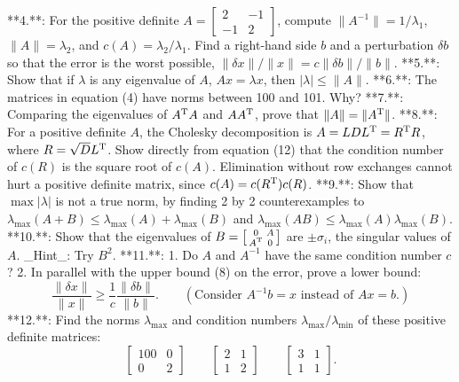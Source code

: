 

**4.**: For the positive definite \(A=\left[\begin{smallmatrix}2&-1\\ -1&2\end{smallmatrix}\right]\), compute \(\|A^{-1}\|=1/\lambda_{1}\), \(\|A\|=\lambda_{2}\), and \(c(A)=\lambda_{2}/\lambda_{1}\). Find a right-hand side \(b\) and a perturbation \(\delta b\) so that the error is the worst possible, \(\|\delta x\|/\|x\|=c\|\delta b\|/\|b\|\).
**5.**: Show that if \(\lambda\) is any eigenvalue of \(A\), \(Ax=\lambda x\), then \(|\lambda|\leq\|A\|\).
**6.**: The matrices in equation (4) have norms between 100 and 101. Why?
**7.**: Comparing the eigenvalues of \(A^{\rm T}A\) and \(AA^{\rm T}\), prove that \(\|A\|=\|A^{\rm T}\|\).
**8.**: For a positive definite \(A\), the Cholesky decomposition is \(A=LDL^{\rm T}=R^{\rm T}R\), where \(R=\sqrt{D}L^{\rm T}\). Show directly from equation (12) that the condition number of \(c(R)\) is the square root of \(c(A)\). Elimination without row exchanges cannot hurt a positive definite matrix, since \(c(A)=c(R^{\rm T})c(R)\).
**9.**: Show that \(\max|\lambda|\) is not a true norm, by finding 2 by 2 counterexamples to \(\lambda_{\max}(A+B)\leq\lambda_{\max}(A)+\lambda_{\max}(B)\) and \(\lambda_{\max}(AB)\leq\lambda_{\max}(A)\lambda_{\max}(B)\).
**10.**: Show that the eigenvalues of \(B=\left[\begin{smallmatrix}0&A\\ A^{\rm T}&0\end{smallmatrix}\right]\) are \(\pm\sigma_{i}\), the singular values of \(A\). _Hint_: Try \(B^{2}\).
**11.**:
1. Do \(A\) and \(A^{-1}\) have the same condition number \(c\)? 2. In parallel with the upper bound (8) on the error, prove a lower bound: \[\frac{\|\delta x\|}{\|x\|}\geq\frac{1}{c}\frac{\|\delta b\|}{\|b\|}.\qquad( \text{Consider }A^{-1}b=x\text{ instead of }Ax=b\text{.})\]
**12.**: Find the norms \(\lambda_{\max}\) and condition numbers \(\lambda_{\max}/\lambda_{\min}\) of these positive definite matrices: \[\left[\begin{matrix}100&0\\ 0&2\end{matrix}\right]\qquad\left[\begin{matrix}2&1\\ 1&2\end{matrix}\right]\qquad\left[\begin{matrix}3&1\\ 1&1\end{matrix}\right].\]

